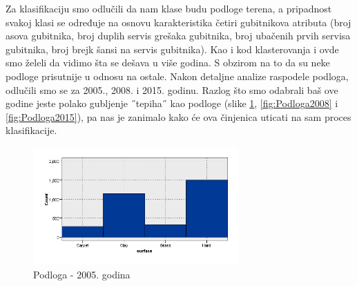 \documentclass[a4paper]{article}
\begin{document}
Za klasifikaciju smo odlučili da nam klase budu podloge terena, a pripadnost svakoj klasi se određuje na osnovu karakteristika četiri gubitnikova atributa (broj asova gubitnika, broj duplih servis grešaka gubitnika, broj ubačenih prvih servisa gubitnika, broj brejk šansi na servis gubitnika). Kao i kod klasterovanja i ovde smo želeli da vidimo šta se dešava u više godina. S obzirom na to da su neke podloge prisutnije u odnosu na ostale. Nakon detaljne analize raspodele podloga, odlučili smo se za 2005., 2008. i 2015. godinu. Razlog što smo odabrali baš ove godine jeste polako gubljenje ˝tepiha˝ kao podloge (slike \ref{fig:Podloga2005}, \ref{fig:Podloga2008} i \ref{fig:Podloga2015}), pa nas je zanimalo kako će ova činjenica uticati na sam proces klasifikacije. 

\begin{figure}[H]
	\begin{center}
		\includegraphics[width=0.7\textwidth]{Klasifikacija/HistogramiPodlogaTerena/Graphboard2005.png}
	\end{center}
	\caption{Podloga - 2005. godina}
	\label{fig:Podloga2005}
\end{figure}
\end{document}
